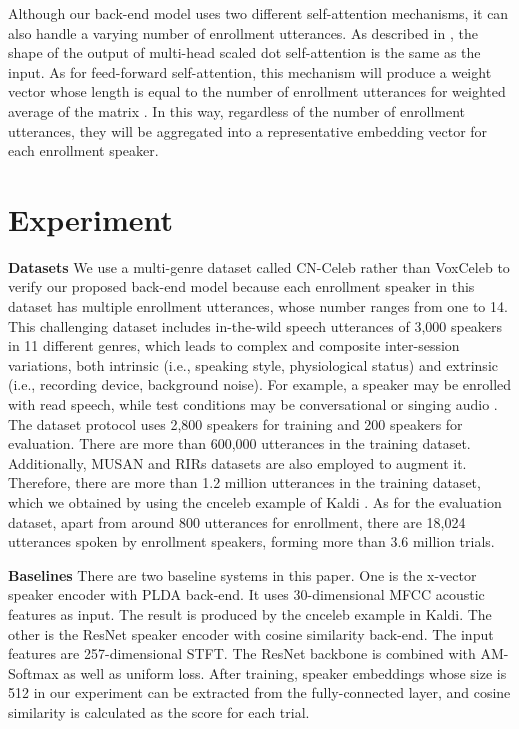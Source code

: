 \documentclass[a4paper]{article}
\begin{document}
Although our back-end model uses two different self-attention mechanisms, it can also handle a varying number of enrollment utterances. As described in \cite{Vaswani2017-Attention}, the shape of the output of multi-head scaled dot self-attention is the same as the input. As for feed-forward self-attention, this mechanism will produce a weight vector whose length is equal to the number of enrollment utterances for weighted average of the matrix . In this way, regardless of the number of enrollment utterances, they will be aggregated into a representative embedding vector for each enrollment speaker. 



\vspace{-2mm}
\section{Experiment}

\noindent 
\textbf{Datasets}
We use a multi-genre dataset called CN-Celeb rather than VoxCeleb to verify our proposed back-end model because each enrollment speaker in this dataset has multiple enrollment utterances, whose number ranges from one to 14. This challenging dataset includes in-the-wild speech utterances of 3,000 speakers in 11 different genres, which leads to complex and composite inter-session variations, both intrinsic (i.e., speaking style, physiological status) and extrinsic (i.e., recording device, background noise). For example, a speaker may be enrolled with read speech, while test conditions may be conversational or singing audio \cite{Li2020-CN2}. The dataset protocol uses 2,800 speakers for training and 200 speakers for evaluation. There are more than 600,000 utterances in the training dataset. Additionally, MUSAN \cite{musan} and RIRs \cite{rirs} datasets are also employed to augment it. Therefore, there are more than 1.2 million utterances in the training dataset, which we obtained by using the cnceleb \cite{cnceleb} example of Kaldi \cite{kaldi}. As for the evaluation dataset, apart from around 800 utterances for enrollment, there are 18,024 utterances spoken by enrollment speakers, forming more than 3.6 million trials.

\noindent 
\textbf{Baselines}
There are two baseline systems in this paper. One is the x-vector speaker encoder with PLDA back-end. It uses 30-dimensional MFCC acoustic features as input. The result is produced by the cnceleb \cite{cnceleb} example in Kaldi. The other is the ResNet speaker encoder with cosine similarity back-end. The input features are 257-dimensional STFT. The ResNet backbone is combined with AM-Softmax as well as uniform loss. After training, speaker embeddings whose size is 512 in our experiment can be extracted from the fully-connected layer, and cosine similarity is calculated as the score for each trial.
\end{document}
